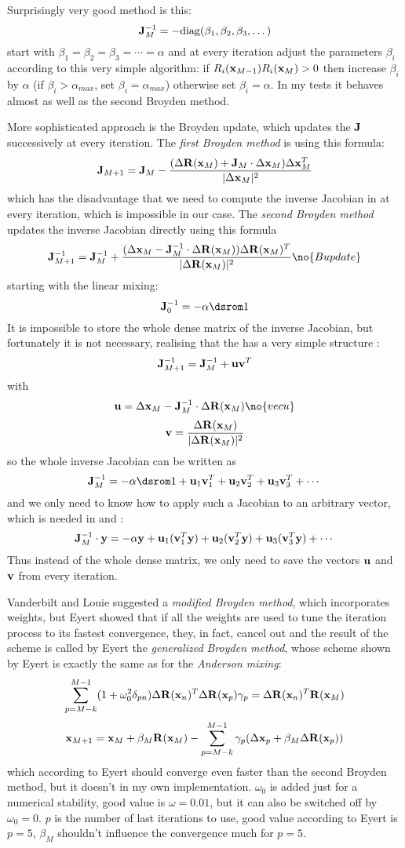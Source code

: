 Surprisingly very good method is this:
$${\bf J}_M^{-1}=-{\rm diag}(\beta_1,\beta_2,\beta_3,\dots)$$
start with $\beta_1=\beta_2=\beta_3=\cdots=\alpha$ and
at every iteration adjust the parameters $\beta_i$ according to this very
simple algorithm: if $R_i({\bf x}_{M-1})R_i({\bf x}_M)>0$ then increase $\beta_i$ by
$\alpha$ (if $\beta_i>\alpha_{max}$, set $\beta_i=\alpha_{max}$) otherwise set
$\beta_i=\alpha$. In my tests it behaves almost as well as the second Broyden
method.

More sophisticated approach is the Broyden update, which 
updates the ${\bf J}$ successively at every iteration. The {\it first Broyden
method\/} is using this formula: 
$${\bf J}_{M+1}={\bf J}_M-{(\Delta{\bf R}({\bf x}_M)+{\bf J}_M\cdot\Delta{\bf x}_M)\Delta{\bf x}_M^T\over 
|\Delta{\bf x}_M|^2}$$
which has the disadvantage that we need to compute the inverse Jacobian in
 at every iteration, which is impossible in our case. The {\it
second Broyden method\/} updates the inverse Jacobian directly using this
formula
$$\J_{M+1}^{-1}=\J_M^{-1}+{(\Delta\x_M-\J_M^{-1}\cdot\Delta\R(\x_M))
\Delta\R(\x_M)^T\over |\Delta\R(\x_M)|^2}\no{Bupdate}$$
starting with the linear mixing:
$$\J_0^{-1}=-\alpha\one$$
It is impossible to store the whole dense matrix of the inverse Jacobian, but
fortunately it is not necessary, realising that the  has a very
simple structure \cite{srivastava}:
$${\bf J}_{M+1}^{-1}={\bf J}_M^{-1}+{\bf u}{\bf v}^T$$ 
with
$${\bf u}=\Delta\x_M-\J_M^{-1}\cdot\Delta\R(\x_M)\no{vecu}$$
$${\bf v}={\Delta{\bf R}({\bf x}_M)\over |\Delta{\bf R}({\bf x}_M)|^2}$$
so the whole inverse Jacobian can be written as
$$\J_M^{-1}=-\alpha\one+{\bf u}_1{\bf v}_1^T+{\bf u}_2{\bf v}_2^T+
{\bf u}_3{\bf v}_3^T+\cdots$$
and we only need to know how to apply such a Jacobian to an arbitrary vector,
which is needed in  and :
$${\bf J}_M^{-1}\cdot{\bf y}=-\alpha{\bf y}+{\bf u}_1({\bf v}_1^T{\bf y})
+{\bf u}_2({\bf v}_2^T{\bf y})+ {\bf u}_3({\bf v}_3^T{\bf y})+\cdots$$
Thus instead of the whole dense matrix, we only need to save the vectors ${\bf
u}$ and ${\bf v}$ from every iteration.

Vanderbilt and Louie \cite{vanderbiltlouie} suggested a {\it modified Broyden
method}, which incorporates weights, but Eyert \cite{eyert} showed that if all
the weights are used to tune the iteration process to its fastest convergence,
they, in fact, cancel out and the result of the scheme is called by Eyert the
{\it generalized Broyden method}, whose scheme shown by Eyert is exactly the
same as for the {\it Anderson mixing}:
$$\sum_{p=M-k}^{M-1}(1+\omega_0^2\delta_{pn})\Delta{\bf R}({\bf x}_n)^T\Delta{\bf R}({\bf x}_p)
\gamma_p =\Delta{\bf R}({\bf x}_n)^T{\bf R}({\bf x}_M) $$
$${\bf x}_{M+1}={\bf x}_M+\beta_M{\bf R}({\bf x}_M)-\sum_{p=M-k}^{M-1}\gamma_p
(\Delta{\bf x}_p+\beta_M\Delta{\bf R}({\bf x}_p)) $$
which according to Eyert should converge even faster than the second Broyden
method, but it doesn't in my own implementation. $\omega_0$ is added just for a
numerical stability, good value is $\omega=0.01$, but it can also be switched
off by $\omega_0=0$. $p$ is the number of last iterations to use, good value
according to Eyert is $p=5$, $\beta_M$ shouldn't influence the convergence
much for $p=5$.


